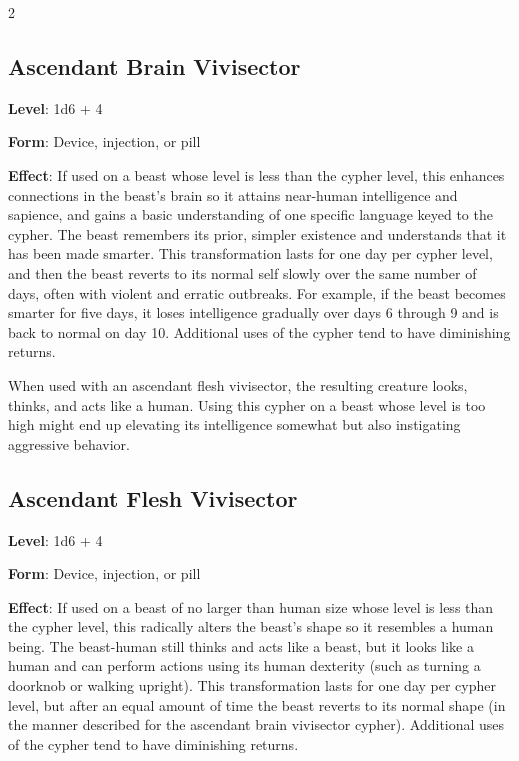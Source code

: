 \begin{multicols}{2}

\subsection{Ascendant Brain Vivisector}

\textbf{Level}: 1d6 + 4

\textbf{Form}: Device, injection, or pill 

\textbf{Effect}: If used on a beast whose level is less than the cypher level, this enhances connections in the beast’s brain so it attains near-human intelligence and sapience, and gains a basic understanding of one specific language keyed to the cypher. The beast remembers its prior, simpler existence and understands that it has been made smarter. This transformation lasts for one day per cypher level, and then the beast reverts to its normal self slowly over the same number of days, often with violent and erratic outbreaks. For example, if the beast becomes smarter for five days, it loses intelligence gradually over days 6 through 9 and is back to normal on day 10. Additional uses of the cypher tend to have diminishing returns.

When used with an ascendant flesh vivisector, the resulting creature looks, thinks, and acts like a human.
Using this cypher on a beast whose level is too high might end up elevating its intelligence somewhat but also instigating aggressive behavior.

\subsection{Ascendant Flesh Vivisector}

\textbf{Level}: 1d6 + 4

\textbf{Form}: Device, injection, or pill 

\textbf{Effect}: If used on a beast of no larger than human size whose level is less than the cypher level, this radically alters the beast’s shape so it resembles a human being. The beast-human still thinks and acts like a beast, but it looks like a human and can perform actions using its human dexterity (such as turning a doorknob or walking upright). This transformation lasts for one day
per cypher level, but after an equal amount of time the beast reverts to its normal shape (in the manner described for the ascendant brain vivisector cypher). Additional uses of the cypher tend to have diminishing returns.


\end{multicols}
